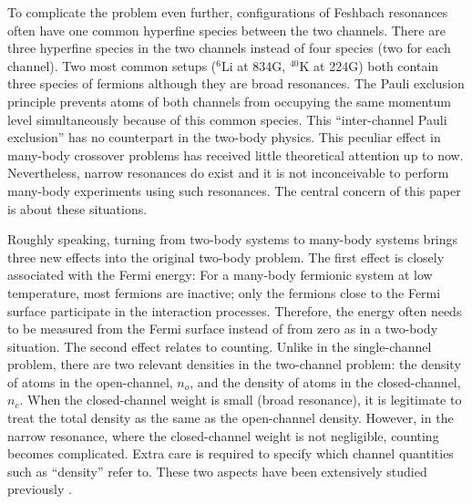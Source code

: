 \documentclass[reprint,pra]{revtex4-1}
\begin{document}

To complicate the problem even further,   configurations of Feshbach resonances often have one common hyperfine species between the two channels. There are three hyperfine species in the  two channels instead of four species (two for each channel).  Two most common setups (${}^{6}\text{Li}$ at 834G, $^{40}\text{K}$ at 224G) both contain three species of fermions although they are broad resonances.  The Pauli exclusion principle prevents  atoms of both channels from occupying the same momentum level simultaneously because of this common species.  This ``inter-channel Pauli exclusion'' has no counterpart in the two-body physics. This peculiar effect  in many-body crossover problems has  received little theoretical attention up to now.    Nevertheless,   narrow resonances do exist \cite{ChinRMP} and it is not  inconceivable to perform many-body experiments using such resonances.  The central concern of this paper is about these situations. 

Roughly speaking, turning from two-body systems to many-body systems brings three new effects into the original two-body problem.  The first effect is closely associated with the Fermi energy:  For a many-body fermionic system at low temperature, most fermions are inactive; only the fermions close to the Fermi surface participate in the interaction processes. Therefore, the energy often needs to be measured from the Fermi surface instead of from zero as in a two-body situation. 
The second effect relates to counting. Unlike in the single-channel problem, there are two relevant densities in the two-channel problem: the density of atoms in the open-channel, $n_{o}$, and the density of atoms in the closed-channel, $n_{c}$. When the closed-channel weight is small (broad resonance), it is legitimate to treat the total density as the same as the open-channel density.  However, in the narrow resonance, where the closed-channel weight is not negligible, counting becomes complicated.  Extra care is required to specify which channel quantities such as ``density'' refer to.  These two aspects have been   extensively studied previously \cite{GurarieNarrow}.
\end{document}
